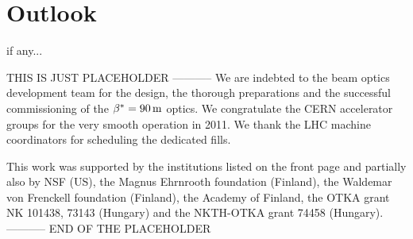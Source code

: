 \documentclass[pdftex,twocolumn,epjc3]{svjour3}
\def\un#1{\,{\rm #1}}
\def\hang{\hangindent=\parindent}
\def\>{\par\vskip\itskip\parindent\itindent\indent\hang\llap{\hbox to3mm{$\bullet$\hss}}}
\def\>E{\par\vskip\itskip\parindent\itindent\indent\hang\llap{\hbox to3mm{\hss}}}
\def\>>{\par\vskip\iitskip\parindent\iitindent\indent\hang\llap{\hbox to\iitindent{\hss--\ }}}
\begin{document}

\section{Outlook}

\> if any...





\begin{acknowledgements}
THIS IS JUST PLACEHOLDER -----------
We are indebted to the beam optics development team
for the design, the thorough preparations and the successful commissioning of the $\beta^* = 90\un{m}$ optics. We congratulate the CERN accelerator groups for the very smooth operation in 2011. We thank
the LHC machine coordinators for scheduling the dedicated fills.

This work was supported by the institutions listed on the front page and partially also by NSF (US), the Magnus
Ehrnrooth foundation (Finland), the Waldemar von Frenckell foundation (Finland), the Academy of
Finland, the OTKA grant NK 101438, 73143 (Hungary) and the NKTH-OTKA grant 74458 (Hungary).
----------- END OF THE PLACEHOLDER
\end{acknowledgements}
\end{document}
